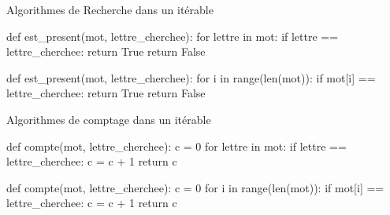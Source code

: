 	
	\begin{easybox}{Algorithmes de Recherche dans un itérable}
	
	\begin{minipage}{0.48\linewidth}
		\begin{CodePythontexAlt}[TaillePolice=\normalsize, Largeur=1\linewidth,Centre,PremLigne=1, Lignes=true,]{}
				def est_present(mot, lettre_cherchee):
					for lettre in mot:
						if lettre == lettre_cherchee:
							return True
					return False
				\end{CodePythontexAlt}
		
	\end{minipage}\hfill
	\begin{minipage}{0.48\linewidth}
		\begin{CodePythontexAlt}[TaillePolice=\normalsize, Largeur=1\linewidth,Centre,PremLigne=1, Lignes=true,]{}
				def est_present(mot, lettre_cherchee):
					for i in range(len(mot)):
						if mot[i] == lettre_cherchee:
							return True
					return False
				\end{CodePythontexAlt}
		
	\end{minipage}
		
		\end{easybox}

	\begin{easybox}{Algorithmes de comptage dans un itérable}
		
		\begin{minipage}{0.48\linewidth}
			\begin{CodePythontexAlt}[TaillePolice=\normalsize, Largeur=1\linewidth,Centre,PremLigne=1, Lignes=true,]{}
			def compte(mot, lettre_cherchee):
				c = 0
				for lettre in mot:
					if lettre == lettre_cherchee:
						c = c + 1
				return c
				
			\end{CodePythontexAlt}
	
		\end{minipage}\hfill
		\begin{minipage}{0.48\linewidth}
		\begin{CodePythontexAlt}[TaillePolice=\normalsize, Largeur=1\linewidth,Centre,PremLigne=1, Lignes=true,]{}
			def compte(mot, lettre_cherchee):
				c = 0
				for i in range(len(mot)):
					if mot[i] == lettre_cherchee:
						c = c + 1
				return c
				
			\end{CodePythontexAlt}
	
		\end{minipage}
		

	\end{easybox}

